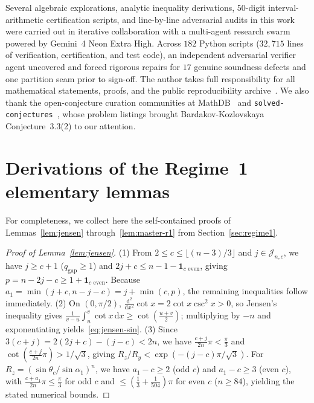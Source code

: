 \documentclass[10pt]{article}
\numberwithin{equation}{section}
\theoremstyle{plain}
\theoremstyle{definition}
\newcommand{\dd}{\mathrm{d}}
\newcommand{\1}{\mathbf{1}}
\newcommand{\code}[1]{\texttt{#1}}
\begin{document}
Several algebraic explorations, analytic inequality derivations, $50$-digit interval-arithmetic certification scripts, and line-by-line adversarial audits in this work were carried out in iterative collaboration with a multi-agent research swarm powered by Gemini~4 Neon Extra High. Across $182$ Python scripts ($32{,}715$ lines of verification, certification, and test code), an independent adversarial verifier agent uncovered and forced rigorous repairs for $17$ genuine soundness defects and one partition seam prior to sign-off. The author takes full responsibility for all mathematical statements, proofs, and the public reproducibility archive~\cite{JadavRepo2026}. We also thank the open-conjecture curation communities at MathDB~\cite{MathDB358383} and \code{solved-conjectures}~\cite{SolvedConj174}, whose problem listings brought Bardakov-Kozlovskaya Conjecture~3.3(2) to our attention.

\appendix

\section{Derivations of the Regime~1 elementary lemmas}
\label{app:regime1}

For completeness, we collect here the self-contained proofs of Lemmas~\ref{lem:jensen} through~\ref{lem:master-r1} from Section~\ref{sec:regime1}.

\begin{proof}[Proof of Lemma~\ref{lem:jensen}]
(1) From $2 \le c \le \lfloor (n-3)/3 \rfloor$ and $j \in \mathcal{J}_{n,c}$, we have $j \ge c + 1$ ($q_{\mathrm{gap}} \ge 1$) and $2j + c \le n - 1 - \1_{c\text{ even}}$, giving $p = n - 2j - c \ge 1 + \1_{c\text{ even}}$. Because $a_1 = \min(j + c, n - j - c) = j + \min(c, p)$, the remaining inequalities follow immediately.
(2) On $(0, \pi/2)$, $\frac{\dd^2}{\dd x^2}\cot x = 2\cot x\csc^2 x > 0$, so Jensen's inequality gives $\frac{1}{v - u}\int_u^v \cot x\,\dd x \ge \cot(\frac{u+v}{2})$; multiplying by $-n$ and exponentiating yields~\eqref{eq:jensen-sin}.
(3) Since $3(c + j) = 2(2j + c) - (j - c) < 2n$, we have $\frac{c+j}{2n}\pi < \frac{\pi}{3}$ and $\cot(\frac{c+j}{2n}\pi) > 1/\sqrt{3}$, giving $R_z/R_y < \exp(-(j-c)\pi/\sqrt{3})$. For $R_z = (\sin\theta_c/\sin\alpha_1)^n$, we have $a_1 - c \ge 2$ (odd $c$) and $a_1 - c \ge 3$ (even $c$), with $\frac{c + a_1}{2n}\pi \le \frac{\pi}{3}$ for odd $c$ and $\le (\frac{1}{3} + \frac{1}{504})\pi$ for even $c$ ($n \ge 84$), yielding the stated numerical bounds.
\end{proof}
\end{document}
